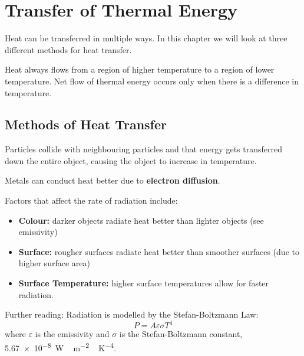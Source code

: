 \documentclass[../main.tex]{subfiles}
\begin{document}
	\section{Transfer of Thermal Energy}
	\begin{preamb}
		Heat can be transferred in multiple ways. In this chapter we will look at three different methods for heat transfer.
	\end{preamb}	
	
	Heat always flows from a region of higher temperature to a region of lower temperature. Net flow of thermal energy occurs only when there is a difference in temperature.
	
	\begin{center}
	\end{center}
	
	\subsection{Methods of Heat Transfer}
	
	Particles collide with neighbouring particles and that energy gets transferred down the entire object, causing the object to increase in temperature.
	
	Metals can conduct heat better due to \textbf{electron diffusion}.
	
	
	
	Factors that affect the rate of radiation include:
	\begin{itemize}
		\item \textbf{Colour:} darker objects radiate heat better than lighter objects (see emissivity)
		\item \textbf{Surface:} rougher surfaces radiate heat better than smoother surfaces (due to higher surface area)
		\item \textbf{Surface Temperature:} higher surface temperatures allow for faster radiation.
	\end{itemize}
	
	Further reading: Radiation is modelled by the Stefan-Boltzmann Law:
		\[ P = A \varepsilon \sigma T^4 \]
	where \(\varepsilon\) is the emissivity and \(\sigma\) is the Stefan-Boltzmann constant, \SI{5.67e-8}{\watt \, \meter^{-2} \, \kelvin^{-4}}.
\end{document}
